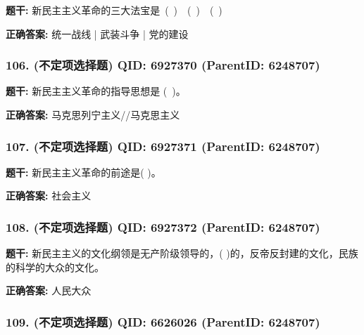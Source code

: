 \documentclass[12pt,UTF8]{ctexart}
\begin{document}
\textbf{题干:}
新民主主义革命的三大法宝是 ( )  ( )  ( )



\textbf{正确答案:}
统一战线 | 武装斗争 | 党的建设

\vspace{0.3em}\hrulefill\vspace{0.7em}

\subsubsection*{106. (不定项选择题) \small QID: 6927370 (ParentID: 6248707)}

\textbf{题干:}
新民主主义革命的指导思想是 ( )。



\textbf{正确答案:}
马克思列宁主义//马克思主义

\vspace{0.3em}\hrulefill\vspace{0.7em}

\subsubsection*{107. (不定项选择题) \small QID: 6927371 (ParentID: 6248707)}

\textbf{题干:}
新民主主义革命的前途是(        )。



\textbf{正确答案:}
社会主义

\vspace{0.3em}\hrulefill\vspace{0.7em}

\subsubsection*{108. (不定项选择题) \small QID: 6927372 (ParentID: 6248707)}

\textbf{题干:}
新民主主义的文化纲领是无产阶级领导的，(      )的，反帝反封建的文化，民族的科学的大众的文化。



\textbf{正确答案:}
人民大众

\vspace{0.3em}\hrulefill\vspace{0.7em}

\subsubsection*{109. (不定项选择题) \small QID: 6626026 (ParentID: 6248707)}
\end{document}
